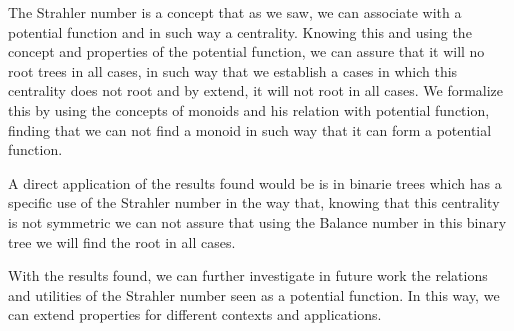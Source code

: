 
The Strahler number is a concept that as we saw, we can associate with a potential function and in such way a centrality. Knowing this and using the concept and properties of the potential function, we can assure that it will no root trees in all cases, in such way that we establish a cases in which this centrality does not root and by extend, it will not root in all cases. We formalize this by using the concepts of monoids and his relation with potential function, finding that we can not find a monoid in such way that it can form a potential function.

A direct application of the results found would be is in binarie trees which has a specific use of the Strahler number in the way that, knowing that this centrality is not symmetric we can not assure that using the Balance number in this binary tree we will find the root in all cases.

With the results found, we can further investigate in future work the relations and utilities of the Strahler number seen as a potential function. In this way, we can extend properties for different contexts and applications.